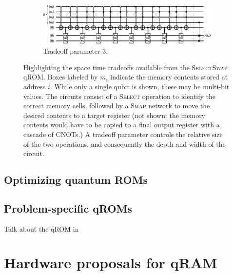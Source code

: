 \documentclass[a4paper,12pt]{article}
\begin{document}
\begin{figure}
\begin{subfigure}[ht!]{\textwidth}
 \centering
 \includegraphics[scale=1.3]{images/select-swap-lambda-3}
 \caption{Tradeoff parameter 3.}
 \end{subfigure}
 \caption{Highlighting the space time tradeoffs available from the \textsc{SelectSwap} qROM. Boxes labeled by $m_i$ indicate the memory contents stored at address $i$. While only a single qubit is shown, these may be multi-bit values. The circuits consist of a \textsc{Select}  operation to identify the correct memory cells, followed by a \textsc{Swap}  network to move the desired contents to a target register (not shown: the memory contents would have to be copied to a final output register with a cascade of CNOTs.) A tradeoff parameter controls the relative size of the two operations, and consequently the depth and width of the circuit.}
\end{figure} 
 
\subsection{Optimizing quantum ROMs}

\subsection{Problem-specific qROMs}

Talk about the qROM in \cite{Babbush2018}

\section{Hardware proposals for qRAM}
\label{sec:hardware}
\end{document}
